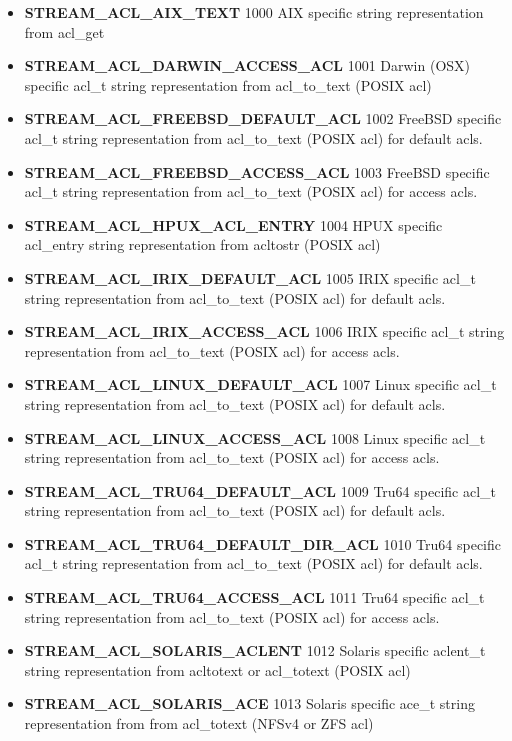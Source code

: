 \begin{itemize}
\item {\bf STREAM\_ACL\_AIX\_TEXT} 1000 AIX specific string representation from
  acl\_get
 \item {\bf STREAM\_ACL\_DARWIN\_ACCESS\_ACL} 1001 Darwin (OSX) specific acl\_t
   string representation from acl\_to\_text (POSIX acl)
  \item {\bf STREAM\_ACL\_FREEBSD\_DEFAULT\_ACL} 1002 FreeBSD specific acl\_t
    string representation from acl\_to\_text (POSIX acl) for default acls.
  \item {\bf STREAM\_ACL\_FREEBSD\_ACCESS\_ACL} 1003 FreeBSD specific acl\_t
    string representation from acl\_to\_text (POSIX acl) for access acls.
  \item {\bf STREAM\_ACL\_HPUX\_ACL\_ENTRY} 1004 HPUX specific acl\_entry
    string representation from acltostr (POSIX acl)
  \item {\bf STREAM\_ACL\_IRIX\_DEFAULT\_ACL} 1005 IRIX specific acl\_t string
    representation from acl\_to\_text (POSIX acl) for default acls.
  \item {\bf STREAM\_ACL\_IRIX\_ACCESS\_ACL} 1006 IRIX specific acl\_t string
    representation from acl\_to\_text (POSIX acl) for access acls.
  \item {\bf STREAM\_ACL\_LINUX\_DEFAULT\_ACL} 1007 Linux specific acl\_t
    string representation from acl\_to\_text (POSIX acl) for default acls.
  \item {\bf STREAM\_ACL\_LINUX\_ACCESS\_ACL} 1008 Linux specific acl\_t string
    representation from acl\_to\_text (POSIX acl) for access acls.
  \item {\bf STREAM\_ACL\_TRU64\_DEFAULT\_ACL} 1009 Tru64 specific acl\_t
    string representation from acl\_to\_text (POSIX acl) for default acls.
  \item {\bf STREAM\_ACL\_TRU64\_DEFAULT\_DIR\_ACL} 1010 Tru64 specific acl\_t
    string representation from acl\_to\_text (POSIX acl) for default acls.
  \item {\bf STREAM\_ACL\_TRU64\_ACCESS\_ACL} 1011 Tru64 specific acl\_t string
    representation from acl\_to\_text (POSIX acl) for access acls.
  \item {\bf STREAM\_ACL\_SOLARIS\_ACLENT} 1012 Solaris specific aclent\_t
    string representation from acltotext or acl\_totext (POSIX acl)
  \item {\bf STREAM\_ACL\_SOLARIS\_ACE} 1013 Solaris specific ace\_t string
    representation from from acl\_totext (NFSv4 or ZFS acl)
\end{itemize}

